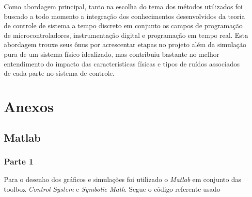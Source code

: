 \documentclass[a4paper,11pt]{article}
\begin{document}
Como abordagem principal, tanto na escolha do tema dos métodos utilizados foi buscado a todo momento a integração dos conhecimentos desenvolvidos da teoria de controle de sistema a tempo discreto em conjunto os campos de programação de microcontroladores, instrumentação digital e programação em tempo real. Esta abordagem trouxe seus ônus por acrescentar etapas no projeto além da simulação pura de um sistema físico idealizado, mas contribuiu bastante no melhor entendimento do impacto das características físicas e tipos de ruídos associados de cada parte no sistema de controle.


\newpage

\nocite{matlabcontrol}
\nocite{matlabsymbolic}
\nocite{ogata2010modern}

\section*{Anexos}



\subsection*{Matlab}

\subsubsection*{Parte 1}
Para o desenho dos gráficos e simulações foi utilizado o \textit{Matlab} em conjunto das toolbox \textit{Control System}\cite{matlabcontrol} e \textit{Symbolic Math}\cite{matlabsymbolic}. Segue o código referente usado
\end{document}
